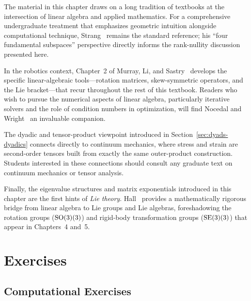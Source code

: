 The material in this chapter draws on a long tradition of textbooks at the
intersection of linear algebra and applied mathematics. For a comprehensive
undergraduate treatment that emphasizes geometric intuition alongside
computational technique, Strang~\cite{strang2019} remains the standard
reference; his ``four fundamental subspaces'' perspective directly informs
the rank-nullity discussion presented here.

In the robotics context, Chapter~2 of Murray, Li, and
Sastry~\cite{Murray1994} develops the specific linear-algebraic tools---rotation
matrices, skew-symmetric operators, and the Lie bracket---that recur throughout
the rest of this textbook. Readers who wish to pursue the numerical aspects of
linear algebra, particularly iterative solvers and the role of condition numbers
in optimization, will find Nocedal and Wright~\cite{nocedal2006} an invaluable
companion.

The dyadic and tensor-product viewpoint introduced in
Section~\ref{sec:dyads-dyadics} connects directly to continuum mechanics, where
stress and strain are second-order tensors built from exactly the same outer-product
construction. Students interested in these connections should consult any
graduate text on continuum mechanics or tensor analysis.

Finally, the eigenvalue structures and matrix exponentials introduced in this
chapter are the first hints of \emph{Lie theory}. Hall~\cite{hall2015} provides
a mathematically rigorous bridge from linear algebra to Lie groups and Lie
algebras, foreshadowing the rotation groups ($\mathrm{SO}(3)(3)$) and rigid-body
transformation groups ($\mathrm{SE}(3)(3)$) that appear in Chapters~4 and~5.

\section{Exercises}
\label{sec:ch1_exercises}

\subsection*{Computational Exercises}

